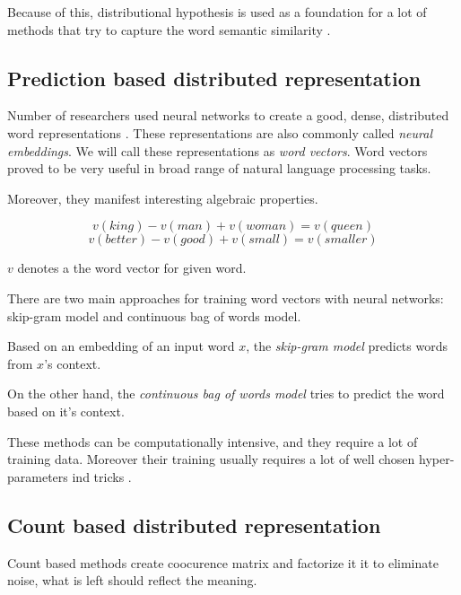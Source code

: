         Because of this, distributional hypothesis is used as a foundation for a lot of methods that try to capture the word semantic similarity \cite{rubenstein1965contextual}. 

        \subsection{Prediction based distributed representation}
        Number of researchers used neural networks to create a good, dense, distributed word representations \cite{pennington2014glove} \cite{DBLP:conf/icml/LeM14} \cite{rong2014word2vec}. %
        These representations are also commonly called \emph{neural embeddings}.
        We will call these representations as \emph{word vectors}.
        Word vectors proved to be very useful in broad range of natural language processing tasks. 
        
        Moreover, they manifest interesting algebraic properties. 
        
        $$v(king) - v(man) + v(woman) = v(queen)$$
        $$v(better) - v(good) + v(small) = v(smaller)$$
        
        $v$ denotes a the word vector for given word.
        
        There are two main approaches for training word vectors with neural networks: skip-gram model and continuous bag of words model.
        
        Based on an embedding of an input word $x$, the \textit{skip-gram model} predicts words from $x$'s context.
        
        On the other hand, the \textit{continuous bag of words model} tries to predict the word based on it's context.
        
        These methods can be computationally intensive, and they require a lot of training data. 
        Moreover their training usually requires a lot of well chosen hyper-parameters ind tricks \cite{DBLP:journals/corr/MikolovSCCD13}. %
        

        \subsection{Count based distributed representation}
        \* %
        
        
        
        Count based methods create coocurence matrix and factorize it it to eliminate noise, 
        what is left should reflect the meaning. 
        
